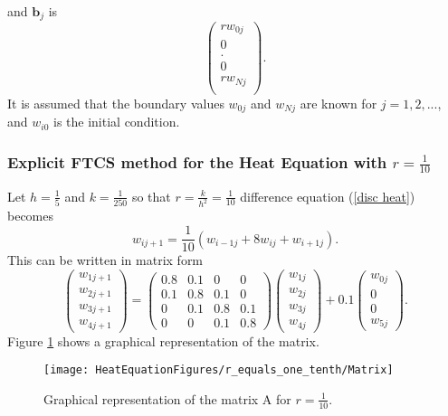 and $\mathbf{b}_j$ is 
\[
\left(\begin{array}{c}
rw_{0j}\\
0\\
.\\
0\\
rw_{Nj}\\
\end{array}\right).
\]
It is assumed that the boundary values $w_{0j}$ and $w_{Nj}$ are known for $j=1,2,...$, and $w_{i0}$ is the initial condition.


\begin{example}
\subsubsection{Explicit FTCS method for the Heat Equation with $r=\frac{1}{10}$}
Let $h=\frac{1}{5}$ and $k=\frac{1}{250}$ so that $r=\frac{k}{h^2}=\frac{1}{10}$
difference equation (\ref{disc heat}) becomes
\[
w_{ij+1}=\frac{1}{10}(w_{i-1j}+8w_{ij}+w_{i+1j}).
\]
This can be written in matrix form 
\[
\left(\begin{array}{c}
w_{1j+1}\\
w_{2j+1}\\
w_{3j+1}\\
w_{4j+1}
\end{array}\right)
=
\left(\begin{array}{cccc}
0.8&0.1&0&0\\
0.1&0.8&0.1&0\\
0&0.1&0.8&0.1\\
0&0&0.1&0.8
\end{array}\right)
\left(\begin{array}{c}
w_{1j}\\
w_{2j}\\
w_{3j}\\
w_{4j}
\end{array}\right)+0.1\left(\begin{array}{c}
w_{0j}\\
0\\
0\\
w_{5j}
\end{array}\right).
\]
Figure \ref{Matrix_FTCS_1_10} shows a graphical representation of the matrix.
\begin{figure}[H]
  \caption{Graphical representation of the matrix A for $r=\frac{1}{10}$. }
  \centering
    \texttt{[image: HeatEquationFigures/r\_equals\_one\_tenth/Matrix]}
    \label{Matrix_FTCS_1_10}
\end{figure}

\end{example}

